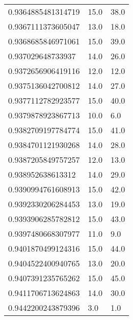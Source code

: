 \begin{center}
\begin{supertabular}[H]{p{0.30\textwidth}p{0.05\textwidth}p{0.05\textwidth}}
0.9364885481314719 & 15.0 & 38.0 \\ 
0.9367111373605047 & 13.0 & 18.0 \\ 
0.9368685846971061 & 15.0 & 39.0 \\ 
0.937029648733937 & 14.0 & 26.0 \\ 
0.9372656906419116 & 12.0 & 12.0 \\ 
0.9375136042700812 & 14.0 & 27.0 \\ 
0.9377112782923577 & 15.0 & 40.0 \\ 
0.9379878923867713 & 10.0 & 6.0 \\ 
0.9382709197784774 & 15.0 & 41.0 \\ 
0.9384701121930268 & 14.0 & 28.0 \\ 
0.9387205849757257 & 12.0 & 13.0 \\ 
0.938952638613312 & 14.0 & 29.0 \\ 
0.9390994761608913 & 15.0 & 42.0 \\ 
0.9392330206284453 & 13.0 & 19.0 \\ 
0.9393906285782812 & 15.0 & 43.0 \\ 
0.9397480668307977 & 11.0 & 9.0 \\ 
0.9401870499124316 & 15.0 & 44.0 \\ 
0.9404522400940765 & 13.0 & 20.0 \\ 
0.9407391235765262 & 15.0 & 45.0 \\ 
0.9411706713624863 & 14.0 & 30.0 \\ 
0.9442200243879396 & 3.0 & 1.0 \\ 
\end{supertabular}
\end{center}
